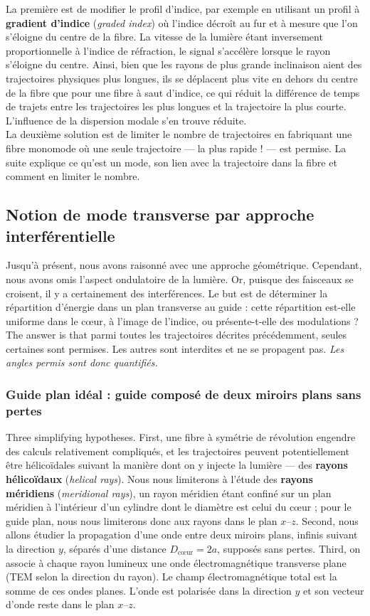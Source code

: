 La première est de modifier le profil d'indice, par exemple en utilisant un
profil à \textbf{gradient d'indice} (\textit{graded index}) où l'indice décroît
au fur et à mesure que l'on s'éloigne du centre de la fibre. La vitesse de la
lumière étant inversement proportionnelle à l'indice de réfraction, le signal
s'accélère lorsque le rayon s'éloigne du centre. Ainsi, bien que les rayons de
plus grande inclinaison aient des trajectoires physiques plus longues, ils se
déplacent plus vite en dehors du centre de la fibre que pour une fibre à saut
d'indice, ce qui réduit la différence de temps de trajets entre les
trajectoires les plus longues et la trajectoire la plus courte. L'influence de
la dispersion modale s'en trouve réduite.\\

La deuxième solution est de limiter le nombre de trajectoires en fabriquant une
fibre monomode où une seule trajectoire --- la plus rapide ! --- est permise.
La suite explique ce qu'est un mode, son lien avec la trajectoire dans la fibre
et comment en limiter le nombre.

\subsection{Notion de mode transverse par approche interférentielle}

Jusqu'à présent, nous avons raisonné avec une approche géométrique. Cependant,
nous avons omis l'aspect ondulatoire de la lumière. Or, puisque des faisceaux
se croisent, il y a certainement des interférences. Le but est de déterminer la
répartition d'énergie dans un plan transverse au guide : cette répartition
est-elle uniforme dans le cœur, à l'image de l'indice, ou présente-t-elle des
modulations ? The answer is that parmi toutes les trajectoires décrites
précédemment, seules certaines sont permises. Les autres sont interdites et ne
se propagent pas. \emph{Les angles permis sont donc quantifiés.}

\subsubsection{Guide plan idéal : guide composé de deux miroirs plans sans pertes}
Three simplifying hypotheses. First, une fibre à symétrie de révolution
engendre des calculs relativement compliqués, et les trajectoires peuvent
potentiellement être hélicoïdales suivant la manière dont on y injecte la
lumière --- des \textbf{rayons hélicoïdaux} (\textit{helical rays}). Nous nous
limiterons à l'étude des \textbf{rayons méridiens} (\textit{meridional rays}),
un rayon méridien étant confiné sur un plan méridien à l'intérieur d'un
cylindre dont le diamètre est celui du cœur ; pour le guide plan, nous nous
limiterons donc aux rayons dans le plan $x$--$z$. Second, nous allons étudier
la propagation d'une onde entre deux miroirs plans, infinis suivant la
direction $y$, séparés d'une distance $D_{\text{cœur}} = 2a$, supposés sans
pertes. Third, on associe à chaque rayon lumineux une onde électromagnétique
transverse plane (TEM selon la direction du rayon). Le champ électromagnétique
total est la somme de ces ondes planes. L'onde est polarisée dans la direction
$y$ et son vecteur d'onde reste dans le plan $x$--$z$.

